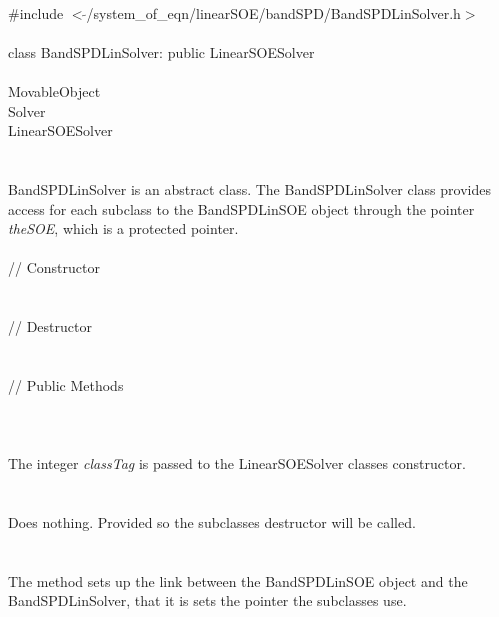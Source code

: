 
   \\
\indent \#include $<\tilde{ }$/system\_of\_eqn/linearSOE/bandSPD/BandSPDLinSolver.h$>$  \\

  \\
\indent class BandSPDLinSolver: public LinearSOESolver  \\

 \\
\indent MovableObject \\
\indent\indent  Solver \\
\indent\indent\indent LinearSOESolver \\
\indent\indent\indent{} \\

  \\
\indent BandSPDLinSolver is an abstract class. The BandSPDLinSolver
class provides access for each subclass to the BandSPDLinSOE object
through the pointer {\em theSOE}, which is a protected pointer. \\

  \\
\indent\indent // Constructor \\
\indent{}  \\ \\
\indent\indent // Destructor \\
\indent{}\\  \\
\indent\indent // Public Methods \\
\indent{} \\

  \\
  \\
The integer {\em classTag} is passed to the LinearSOESolver classes
constructor. \\ 

 \\
\\ 
Does nothing. Provided so the subclasses destructor will be called. \\

  \\
 \\
The method sets up the link between the BandSPDLinSOE object and the
BandSPDLinSolver, that it is sets the pointer the subclasses use.  \\





